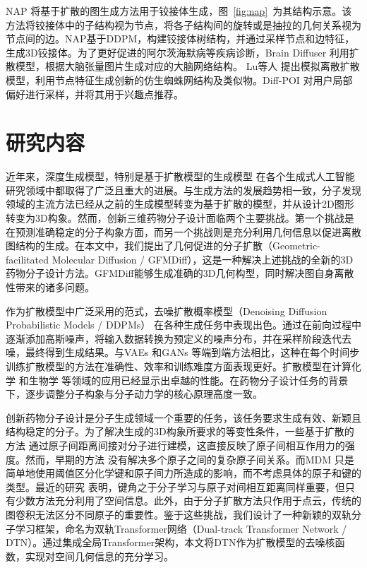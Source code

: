 NAP \cite{nap_lei_23}将基于扩散的图生成方法用于铰接体生成，图~\ref{fig:nap}~为其结构示意。该方法将铰接体中的子结构视为节点，将各子结构间的旋转或是抽拉的几何关系视为节点间的边。NAP基于DDPM，构建铰接体树结构，并通过采样节点和边特征，生成3D铰接体。为了更好促进的阿尔茨海默病等疾病诊断，Brain Diffuser \cite{braindiffuser_chen_23}利用扩散模型，根据大脑张量图片生成对应的大脑网络结构。 Lu等人 \cite{modeling_lu_23}提出模拟离散扩散模型，利用节点特征生成创新的仿生蜘蛛网结构及类似物。Diff-POI \cite{diffpoi_qin_23}对用户局部偏好进行采样，并将其用于兴趣点推荐。

\section{研究内容}
近年来，深度生成模型，特别是基于扩散模型的生成模型 \cite{ddpm_ho_20,sgm_song_19,scoresde_song_21}在各个生成式人工智能研究领域中都取得了广泛且重大的进展。与生成方法的发展趋势相一致，分子发现领域的主流方法已经从之前的生成模型转变为基于扩散的模型，并从设计2D图形转变为3D构象。然而，创新三维药物分子设计面临两个主要挑战。第一个挑战是在预测准确稳定的分子构象方面，而另一个挑战则是充分利用几何信息以促进离散图结构的生成。在本文中，我们提出了几何促进的分子扩散（Geometric-facilitated Molecular Diffusion / GFMDiff），这是一种解决上述挑战的全新的3D药物分子设计方法。GFMDiff能够生成准确的3D几何构型，同时解决图自身离散性带来的诸多问题。

作为扩散模型中广泛采用的范式，去噪扩散概率模型（Denoising Diffusion Probabilistic Models / DDPMs） \cite{ddpm_ho_20,dpm_jascha_15}在各种生成任务中表现出色。通过在前向过程中逐渐添加高斯噪声，将输入数据转换为预定义的噪声分布，并在采样阶段迭代去噪，最终得到生成结果。与VAEs \cite{vae_kingma_13}和GANs \cite{gan_goodfellow_14}等端到端方法相比，这种在每个时间步训练扩散模型的方法在准确性、效率和训练难度方面表现更好。扩散模型在计算化学 \cite{edm_hoogeboom_22,targetdiff_guan_23}和生物学 \cite{diffab_luo_22,protseed_shi_23}等领域的应用已经显示出卓越的性能。在药物分子设计任务的背景下，逐步调整分子构象与分子动力学的核心原理高度一致。

创新药物分子设计是分子生成领域一个重要的任务，该任务要求生成有效、新颖且结构稳定的分子。为了解决生成的3D构象所要求的等变性条件，一些基于扩散的方法 \cite{edm_hoogeboom_22,mdm_huang_23}通过原子间距离间接对分子进行建模，这直接反映了原子间相互作用力的强度。然而，早期的方法 \cite{edm_hoogeboom_22}没有解决多个原子之间的复杂原子间关系。而MDM \cite{mdm_huang_23}只是简单地使用阈值区分化学键和原子间力所造成的影响，而不考虑具体的原子和键的类型。最近的研究 \cite{moleformer_yuan_23}表明，键角之于分子学习与原子对间相互距离同样重要，但只有少数方法充分利用了空间信息。此外，由于分子扩散方法只作用于点云，传统的图卷积无法区分不同原子的重要性。鉴于这些挑战，我们设计了一种新颖的双轨分子学习框架，命名为双轨Transformer网络（Dual-track Transformer Network / DTN）。通过集成全局Transformer架构，本文将DTN作为扩散模型的去噪核函数，实现对空间几何信息的充分学习。

